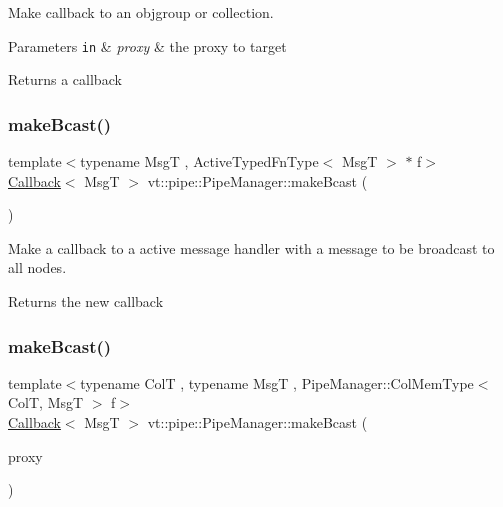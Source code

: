 Make callback to an objgroup or collection. 


\begin{DoxyParams}[1]{Parameters}
\mbox{\tt in}  & {\em proxy} & the proxy to target\\
\hline
\end{DoxyParams}
\begin{DoxyReturn}{Returns}
a callback 
\end{DoxyReturn}
\mbox{\label{structvt_1_1pipe_1_1_pipe_manager_a2ea6bd5ea3e001662681b1e5a1971e9d}} 
\subsubsection{\texorpdfstring{make\+Bcast()}{makeBcast()}\hspace{0.1cm}{\footnotesize\ttfamily [4/7]}}
{\footnotesize\ttfamily template$<$typename MsgT , Active\+Typed\+Fn\+Type$<$ Msg\+T $>$ $\ast$ f$>$ \\
\hyperlink{namespacevt_a57b238783d05de96bc2c4027f7073b7f}{Callback}$<$ MsgT $>$ vt\+::pipe\+::\+Pipe\+Manager\+::make\+Bcast (\begin{DoxyParamCaption}{ }\end{DoxyParamCaption})}



Make a callback to a active message handler with a message to be broadcast to all nodes. 

\begin{DoxyReturn}{Returns}
the new callback 
\end{DoxyReturn}
\mbox{\label{structvt_1_1pipe_1_1_pipe_manager_a1fefc503b58bbdf791e76a6c8f339df6}} 
\subsubsection{\texorpdfstring{make\+Bcast()}{makeBcast()}\hspace{0.1cm}{\footnotesize\ttfamily [5/7]}}
{\footnotesize\ttfamily template$<$typename ColT , typename MsgT , Pipe\+Manager\+::\+Col\+Mem\+Type$<$ Col\+T, Msg\+T $>$ f$>$ \\
\hyperlink{namespacevt_a57b238783d05de96bc2c4027f7073b7f}{Callback}$<$ MsgT $>$ vt\+::pipe\+::\+Pipe\+Manager\+::make\+Bcast (\begin{DoxyParamCaption}\item[{\hyperlink{structvt_1_1pipe_1_1_pipe_manager_t_l_af56c58cad882496e35f01227d4da3898}{Col\+Proxy\+Type}$<$ ColT $>$}]{proxy }\end{DoxyParamCaption})}




